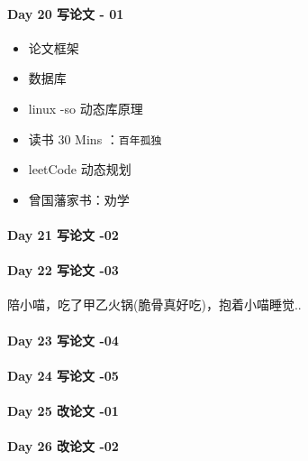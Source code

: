\documentclass[UTF8,a4paper,8pt]{ctexart}
\begin{document}
 	 \paragraph{Day 20  写论文 - 01    \quad     }
	 	 \begin{itemize}[itemindent = 1em]
	 	 	\renewcommand\labelitemi{\makebox[0pt][l]{$\square$}\hspace{1em}} 
	 	 	\renewcommand\labelitemi{\makebox[0pt][l]{$\square$}\raisebox{.15ex}{\hspace{0.1em}$\checkmark$}}	
	 	 	\item   论文框架	
	 	 	\item 	数据库
	 	 	\item   linux -so 动态库原理
	 	 	
	 	 	\item   读书  30 Mins	：\verb|百年孤独|
	 	 	\item   leetCode 动态规划
	 	 	
	 	 	\renewcommand\labelitemi{\makebox[0pt][l]{$\square$}\hspace{1em}}
	 	 	\item  曾国藩家书：劝学
	 	 \end{itemize}
 	 \paragraph{Day 21  写论文 -02     \quad     }
 	 \paragraph{Day 22  写论文 -03     \quad     }
	 	 陪小喵，吃了甲乙火锅(脆骨真好吃)，抱着小喵睡觉..
 	 \paragraph{Day 23  写论文 -04     \quad     }
 	 \paragraph{Day 24  写论文 -05     \quad     }
 	 \paragraph{Day 25  改论文 -01     \quad     }
 	 \paragraph{Day 26  改论文 -02     \quad     }
\end{document}

